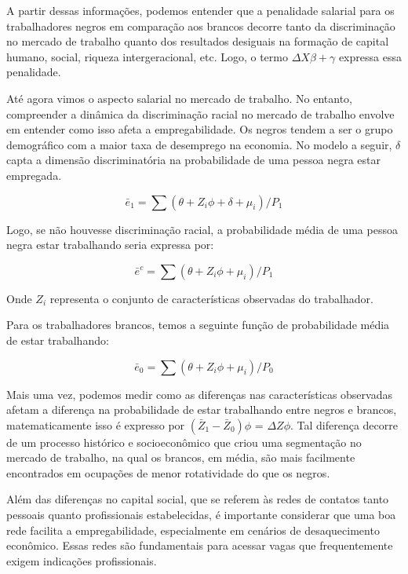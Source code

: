 \documentclass{article}
\begin{document}
	A partir dessas informações, podemos entender que a penalidade salarial para os trabalhadores negros em comparação aos brancos decorre tanto da discriminação no mercado de trabalho quanto dos resultados desiguais na formação de capital humano, social, riqueza intergeracional, etc. Logo, o termo $\Delta X\beta + \gamma$ expressa essa penalidade. \newline
	
	Até agora vimos o aspecto salarial no mercado de trabalho. No entanto, compreender a dinâmica da discriminação racial no mercado de trabalho envolve em entender como isso afeta a empregabilidade. Os negros tendem a ser o grupo demográfico com a maior taxa de desemprego na economia. No modelo a seguir, $\delta$ capta a dimensão discriminatória na probabilidade de uma pessoa negra estar empregada.
	
	\begin{equation}
		\bar{e}_{1} = \sum (\theta + Z_{i}\phi + \delta + \mu_{i})/ P_{1}
	\end{equation}
	
	Logo, se não houvesse discriminação racial, a probabilidade média de uma pessoa negra estar trabalhando seria expressa por:
	
	\begin{equation}
		\bar{e}^{c} = \sum (\theta + Z_{i}\phi + \mu_{i})/ P_{1}
	\end{equation}
	
	Onde  $ Z_{i}$ representa o conjunto de características observadas do trabalhador. \newline
	
	Para os trabalhadores brancos, temos a seguinte função de probabilidade média de estar trabalhando:
	
	\begin{equation}
		\bar{e}_{0} = \sum (\theta + Z_{i}\phi + \mu_{i})/ P_{0}
	\end{equation}
	
	Mais uma vez, podemos medir como as diferenças nas características observadas afetam a diferença na probabilidade de estar trabalhando entre negros e brancos, matematicamente isso é expresso por $(\bar{Z}_{1} - \bar{Z}_{0})\phi$ = $\Delta Z\phi$. Tal diferença decorre de um processo histórico e socioeconômico que criou uma segmentação no mercado de trabalho, na qual os brancos, em média, são mais facilmente encontrados em ocupações de menor rotatividade do que os negros. \newline
	
	Além das diferenças no capital social, que se referem às redes de contatos tanto pessoais quanto profissionais estabelecidas, é importante considerar que uma boa rede facilita a empregabilidade, especialmente em cenários de desaquecimento econômico. Essas redes são fundamentais para acessar vagas que frequentemente exigem indicações profissionais. \newline
	
\end{document}
